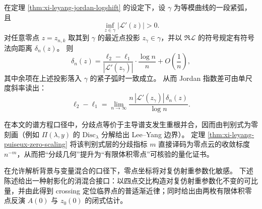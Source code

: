 \begin{corollary}\label{cor:xi-leyang-identify-jordan-gap-from-zeros}
在定理 \ref{thm:xi-leyang-jordan-logshift} 的设定下，设 \(\gamma\) 为等模曲线的一段紧弧，且
\[
\inf_{z\in\gamma}|\mathcal{L}'(z)|>0.
\]
对任意零点 \(z=z_{n,k}\) 取其到 \(\gamma\) 的最近点投影 \(z_\gamma\in\gamma\)，并以 \(\Re\mathcal{L}\) 的符号规定有符号法向距离 \(\delta_n(z)\)。
则
\[
\delta_n(z)=\frac{\ell_2-\ell_1}{|\mathcal{L}'(z_\gamma)|}\cdot\frac{\log n}{n}+O\!\left(\frac{1}{n}\right),
\]
其中余项在上述投影落入 \(\gamma\) 的紧子弧时一致成立。
从而 Jordan 指数差可由单尺度斜率读出：
\[
\ell_2-\ell_1=\lim_{n\to\infty}\frac{n\,|\mathcal{L}'(z_\gamma)|\,\delta_n(z)}{\log n}.
\]
\end{corollary}

\begin{remark}[与谱判别式的对齐]\label{rem:xi-leyang-logshift-puiseux-discriminant-alignment}
在本文的谱方程口径中，分歧点等价于主导谱支发生重根并合，因而由判别式为零刻画（例如 \(\Pi(\lambda,y)\) 的 \(\mathrm{Disc}_\lambda\) 分解给出 Lee--Yang 边界）。
定理 \ref{thm:xi-leyang-puiseux-zero-scaling} 将该判别式层的分歧指标 \(m\) 直接译码为零点云的收敛标度 \(n^{-m}\)，从而把“分歧几何”提升为“有限体积零点”可核验的量化证书。
\end{remark}

在允许解析背景与变量混合的口径下，零点坐标将对复仿射重参数化敏感。
下述陈述给出一种射影化的消混合接口：以四点交比构造对复仿射重参数化不变的可比量，并由此得到 crossing 定位临界点的普适渐近律；同时给出由两枚有限体积零点反演 \(A(0)\) 与 \(z_0(0)\) 的闭式估计。

